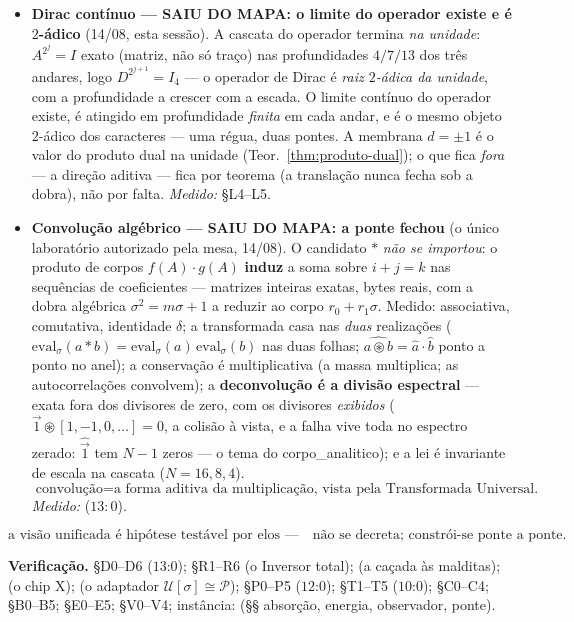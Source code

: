 \documentclass[livro.tex]{subfiles}
\begin{document}
\begin{itemize}
($3\nmid2^{2^{j}}$, Euler nos três andares).
\[
\boxed{\text{La Hire} = \text{a dobra $H$ lida em geometria: rotação
$\xrightarrow{H}$ translação.}}
\]
\emph{Medido:}  ($7{:}0$; assinado
pelo contrato $\mathcal{M}$).
\item \textbf{Dirac contínuo --- SAIU DO MAPA: o limite do operador
existe e é $2$-ádico} (14/08, esta sessão). A cascata do operador
termina \emph{na unidade}: $A^{2^{j}}=I$ exato (matriz, não só
traço) nas profundidades $4/7/13$ dos três andares, logo
$D^{2^{j+1}}=I_{4}$ --- o operador de Dirac é \emph{raiz $2$-ádica da
unidade}, com a profundidade a crescer com a escada. O limite contínuo
do operador existe, é atingido em profundidade \emph{finita} em cada
andar, e é o mesmo objeto $2$-ádico dos caracteres --- uma régua, duas
pontes. A membrana $d=\pm1$ é o valor do produto dual na unidade
(Teor.~\ref{thm:produto-dual}); o que fica \emph{fora} --- a direção
aditiva --- fica por teorema (a translação nunca fecha sob a dobra),
não por falta.
\emph{Medido:}  \S L4--L5.
\item \textbf{Convolução algébrico --- SAIU DO MAPA: a ponte fechou}
(o único laboratório autorizado pela mesa, 14/08). O candidato $*$
\emph{não se importou}: o produto de corpos $f(A)\cdot g(A)$
\textbf{induz} a soma sobre $i{+}j{=}k$ nas sequências de coeficientes
--- matrizes inteiras exatas, bytes reais, com a dobra algébrica
$\sigma^{2}=m\sigma{+}1$ a reduzir ao corpo $r_{0}{+}r_{1}\sigma$.
Medido: associativa, comutativa, identidade $\delta$; a transformada
casa nas \emph{duas} realizações ($\mathrm{eval}_{\sigma}(a{*}b)=
\mathrm{eval}_{\sigma}(a)\,\mathrm{eval}_{\sigma}(b)$ nas duas folhas;
$\widehat{a\circledast b}=\hat{a}\cdot\hat{b}$ ponto a ponto no anel);
a conservação é multiplicativa (a massa multiplica; as autocorrelações
convolvem); a \textbf{deconvolução é a divisão espectral} --- exata
fora dos divisores de zero, com os divisores \emph{exibidos}
($\vec{1}\circledast[1,-1,0,\dots]=0$, a colisão à vista, e a falha
vive toda no espectro zerado: $\widehat{\vec{1}}$ tem $N{-}1$ zeros
--- o tema do corpo\_analitico); e a lei é invariante de escala na
cascata ($N=16,8,4$).
\[
\boxed{\text{convolução}=\text{a forma aditiva da multiplicação, vista
pela Transformada Universal.}}
\]
\emph{Medido:}  ($13{:}0$).
\end{itemize}
\[
\boxed{
\text{a visão unificada é hipótese testável por elos ---}
\quad
\text{não se decreta; constrói-se ponte a ponte.}
}
\]

\bigskip
\noindent\textbf{Verificação.}
 \S D0--D6 ($13$:$0$);
 \S R1--R6 (o Inversor total);
 (a caçada às malditas);
 (o chip X);
 (o adaptador $\mathcal U[\sigma]\cong\mathcal P$);
 \S P0--P5 ($12$:$0$);
 \S T1--T5 ($10$:$0$);
 \S C0--C4;
 \S B0--B5;
 \S E0--E5;
 \S V0--V4;
instância:  (§§ absorção, energia,
observador, ponte).
\end{document}
